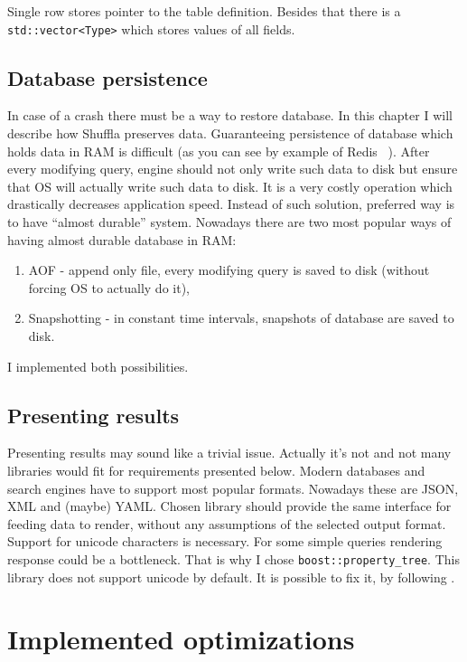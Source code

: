 \documentclass[10pt,a4paper]{article}
\begin{document}
Single row stores pointer to the table definition. Besides that there is a \verb|std::vector<Type>| which stores values of all fields.

\subsection{Database persistence}

In case of a crash there must be a way to restore database. In this chapter I will describe how Shuffla preserves data. Guaranteeing persistence of database which holds data in RAM is difficult (as you can see by example of Redis ~\cite{REDPE}). After every modifying query, engine should not only write such data to disk but ensure that OS will actually write such data to disk. It is a very costly operation which drastically decreases application speed. Instead of such solution, preferred way is to have “almost durable” system.
Nowadays there are two most popular ways of having almost durable database in RAM:

\begin{enumerate}
\item AOF - append only file, every modifying query is saved to disk (without forcing OS to actually do it),
\item Snapshotting - in constant time intervals, snapshots of database are saved to disk.
\end{enumerate}
I implemented both possibilities. 

\subsection{Presenting results}

Presenting results may sound like a trivial issue. Actually it's not and not many libraries would fit for requirements presented below. Modern databases and search engines have to support most popular formats. Nowadays these are JSON, XML and (maybe) YAML. Chosen library should provide the same interface for feeding data to render, without any assumptions of the selected output format. Support for unicode characters is necessary. For some simple queries rendering response could be a bottleneck. That is why I chose \verb|boost::property_tree|. This library does not support unicode by default. It is possible to fix it, by following \cite{SOANS} .

\section{Implemented optimizations}
\end{document}
